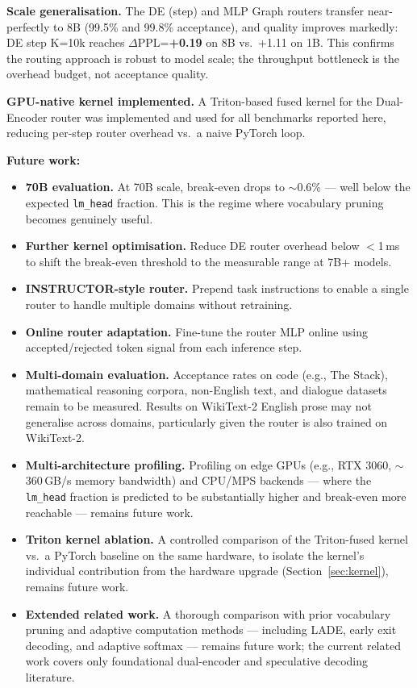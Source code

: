 \documentclass[twocolumn,10pt]{article}
\newcommand{\code}[1]{\texttt{#1}}
\begin{document}
\textbf{Scale generalisation.} The DE (step) and MLP Graph routers transfer
near-perfectly to 8B (99.5\% and 99.8\% acceptance), and quality improves
markedly: DE step K=10k reaches $\Delta$PPL=\textbf{+0.19} on 8B vs.\ +1.11
on 1B. This confirms the routing approach is robust to model scale; the
throughput bottleneck is the overhead budget, not acceptance quality.

\textbf{GPU-native kernel implemented.} A Triton-based fused kernel for the
Dual-Encoder router was implemented and used for all benchmarks reported
here, reducing per-step router overhead vs.\ a naive PyTorch loop.

\textbf{Future work:}
\begin{itemize}[leftmargin=*, itemsep=1pt, topsep=2pt]
  \item \textbf{70B evaluation.} At 70B scale, break-even drops to
        ${\sim}0.6\%$ --- well below the expected \code{lm\_head} fraction.
        This is the regime where vocabulary pruning becomes genuinely useful.
  \item \textbf{Further kernel optimisation.} Reduce DE router overhead
        below $<$1\,ms to shift the break-even threshold to the measurable range
        at 7B+ models.
  \item \textbf{INSTRUCTOR-style router.} Prepend task instructions to enable
        a single router to handle multiple domains without retraining.
  \item \textbf{Online router adaptation.} Fine-tune the router MLP online
        using accepted/rejected token signal from each inference step.
  \item \textbf{Multi-domain evaluation.} Acceptance rates on code (e.g.,
        The Stack), mathematical reasoning corpora, non-English text, and
        dialogue datasets remain to be measured. Results on WikiText-2 English
        prose may not generalise across domains, particularly given the router
        is also trained on WikiText-2.
  \item \textbf{Multi-architecture profiling.} Profiling on edge GPUs
        (e.g., RTX 3060, $\sim$360\,GB/s memory bandwidth) and CPU/MPS
        backends --- where the \code{lm\_head} fraction is predicted to be
        substantially higher and break-even more reachable --- remains future
        work.
  \item \textbf{Triton kernel ablation.} A controlled comparison of the
        Triton-fused kernel vs.\ a PyTorch baseline on the same hardware, to
        isolate the kernel's individual contribution from the hardware upgrade
        (Section~\ref{sec:kernel}), remains future work.
  \item \textbf{Extended related work.} A thorough comparison with prior
        vocabulary pruning and adaptive computation methods --- including LADE,
        early exit decoding, and adaptive softmax --- remains future work; the
        current related work covers only foundational dual-encoder and
        speculative decoding literature.
\end{itemize}
\end{document}
